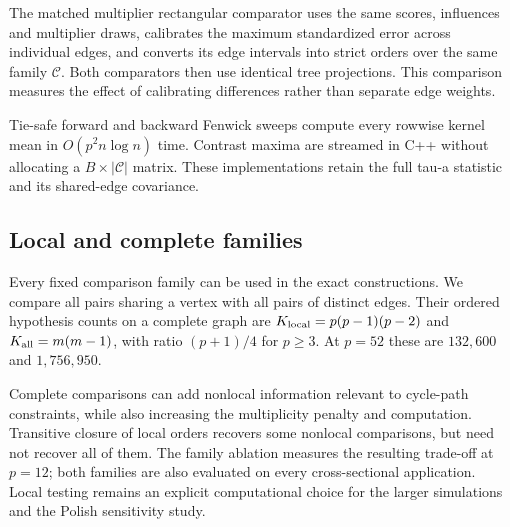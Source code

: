 The matched multiplier rectangular comparator uses the same scores, influences and multiplier draws, calibrates the maximum standardized error across individual edges, and converts its edge intervals into strict orders over the same family $\mathcal C$. Both comparators then use identical tree projections. This comparison measures the effect of calibrating differences rather than separate edge weights.

Tie-safe forward and backward Fenwick sweeps compute every rowwise kernel mean in $O(p^2n\log n)$ time. Contrast maxima are streamed in C++ without allocating a $B\times|\mathcal C|$ matrix. These implementations retain the full tau-a statistic and its shared-edge covariance.

\subsection{Local and complete families}
Every fixed comparison family can be used in the exact constructions. We compare all pairs sharing a vertex with all pairs of distinct edges. Their ordered hypothesis counts on a complete graph are $K_{\rm local}=p(p-1)(p-2)$ and $K_{\rm all}=m(m-1)$, with ratio $(p+1)/4$ for $p\ge3$. At $p=52$ these are $132{,}600$ and $1{,}756{,}950$.

Complete comparisons can add nonlocal information relevant to cycle-path constraints, while also increasing the multiplicity penalty and computation. Transitive closure of local orders recovers some nonlocal comparisons, but need not recover all of them. The family ablation measures the resulting trade-off at $p=12$; both families are also evaluated on every cross-sectional application. Local testing remains an explicit computational choice for the larger simulations and the Polish sensitivity study.
